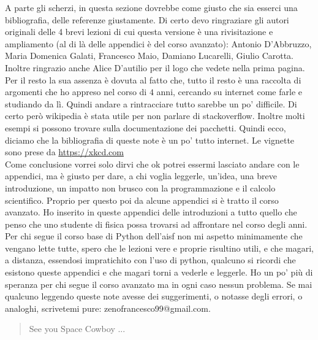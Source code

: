 \documentclass[10pt,a4paper]{article}
\begin{document}
A parte gli scherzi, in questa sezione dovrebbe come giusto che sia esserci una bibliografia, delle referenze giustamente. Di certo devo ringraziare gli autori originali delle 4 brevi lezioni di cui questa versione è una rivisitazione e ampliamento (al di là delle appendici è del corso avanzato): Antonio D'Abbruzzo, Maria Domenica Galati, Francesco Maio, Damiano Lucarelli, Giulio Carotta. Inoltre ringrazio anche Alice D'autilio per il logo che vedete nella prima pagina. Per il resto la sua assenza è dovuta al fatto che, tutto il resto è una raccolta di argomenti che ho appreso nel corso di $4$ anni, cercando su internet come farle e studiando da lì. Quindi andare a rintracciare tutto sarebbe un po' difficile. Di certo però wikipedia è stata utile per non parlare di stackoverflow. Inoltre molti esempi si possono trovare sulla documentazione dei pacchetti. Quindi ecco, diciamo che la bibliografia di queste note è un po' tutto internet. Le vignette sono prese da \url{https://xkcd.com}\\

Come conclusione vorrei solo dirvi che ok potrei essermi lasciato andare con le appendici, ma è giusto per dare, a chi voglia leggerle, un'idea, una breve introduzione, un impatto non brusco con la programmazione e il calcolo scientifico. Proprio per questo poi da alcune appendici si è tratto il corso avanzato.
Ho inserito in queste appendici delle introduzioni a tutto quello che penso che uno studente di fisica possa trovarsi ad affrontare nel corso degli anni.
Per chi segue il corso base di Python dell'aisf non mi aspetto minimamente che vengano lette tutte, spero che le lezioni vere e proprie risultino utili, e che magari, a distanza, essendosi impratichito con l'uso di python, qualcuno si ricordi che esistono queste appendici e che magari torni a vederle e leggerle. Ho un po' più di speranza per chi segue il corso avanzato ma in ogni caso nessun problema. Se mai qualcuno leggendo queste note avesse dei suggerimenti, o notasse degli errori, o analoghi, scrivetemi pure: zenofrancesco99@gmail.com.







\vfill
\begin{quote}
    See you Space Cowboy ...
\end{quote}
\end{document}
